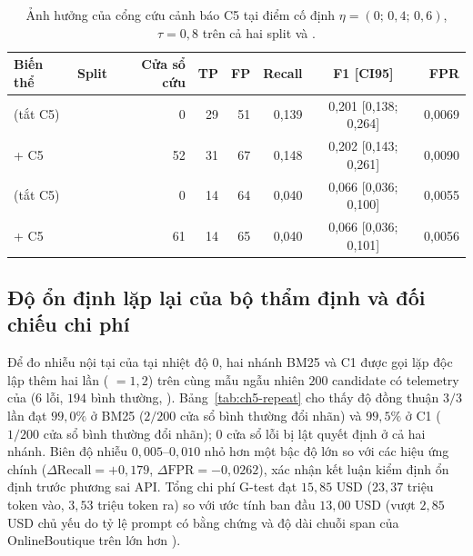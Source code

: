 \begin{table}[htbp]
  \centering
  \caption[So sánh CTAV và CTAV + C5 một điểm trên val và test]{Ảnh hưởng của cổng cứu cảnh báo C5 tại điểm cố định $\eta = (0;\, 0{,}4;\, 0{,}6)$, $\tau = 0{,}8$ trên cả hai split  và .}
  \label{tab:ch5-test-c5}
  \scriptsize
  \renewcommand{\arraystretch}{1.15}
  \begin{tabularx}{\linewidth}{@{}Y l r r r r c r@{}}
    \toprule
    \textbf{Biến thể} & \textbf{Split} & \textbf{Cửa sổ cứu} & \textbf{TP} & \textbf{FP} & \textbf{Recall} & \textbf{F1 [CI95]} & \textbf{FPR} \\
    \midrule
    \CTAV{} (tắt C5) &  & 0 & 29 & 51 & 0,139 & 0,201 [0,138; 0,264] & 0,0069 \\
    \CTAV{} + C5 &  & 52 & 31 & 67 & 0,148 & 0,202 [0,143; 0,261] & 0,0090 \\
    \CTAV{} (tắt C5) &  & 0 & 14 & 64 & 0,040 & 0,066 [0,036; 0,100] & 0,0055 \\
    \CTAV{} + C5 &  & 61 & 14 & 65 & 0,040 & 0,066 [0,036; 0,101] & 0,0056 \\
    \bottomrule
  \end{tabularx}
\end{table}

\subsection{Độ ổn định lặp lại của bộ thẩm định và đối chiếu chi phí}
\label{sec:ch5-repeat}

Để đo nhiễu nội tại của  tại nhiệt độ $0$, hai nhánh BM25 và C1 được gọi lặp độc lập thêm hai lần ( $= 1, 2$) trên cùng mẫu ngẫu nhiên $200$ candidate có telemetry của  ($6$ lỗi, $194$ bình thường, ). Bảng~\ref{tab:ch5-repeat} cho thấy độ đồng thuận $3/3$ lần đạt $99{,}0\%$ ở BM25 ($2/200$ cửa sổ bình thường đổi nhãn) và $99{,}5\%$ ở C1 ($1/200$ cửa sổ bình thường đổi nhãn); $0$ cửa sổ lỗi bị lật quyết định ở cả hai nhánh. Biên độ nhiễu $0{,}005$--$0{,}010$ nhỏ hơn một bậc độ lớn so với các hiệu ứng chính ($\Delta\text{Recall} = +0{,}179$, $\Delta\text{FPR} = -0{,}0262$), xác nhận kết luận kiểm định ổn định trước phương sai API. Tổng chi phí G-test đạt $15{,}85$ USD ($23{,}37$ triệu token vào, $3{,}53$ triệu token ra) so với ước tính ban đầu $13{,}00$ USD (vượt $2{,}85$ USD chủ yếu do tỷ lệ prompt có bằng chứng và độ dài chuỗi span của OnlineBoutique trên  lớn hơn ).

